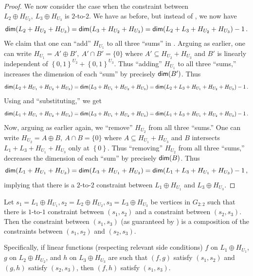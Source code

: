 \documentclass{toc}
\newcommand\set[1]{{\left\{ #1 \right\}}}
\newcommand\power[1]{\set{0,1}^{#1}}
\newcommand*\xor{\mathbin{\oplus}}
\begin{document}
\begin{proof}
\medskip
We now consider the case when the constraint between $L_2\xor H_{U_2}, ~L_3\xor H_{U_3}$ is $2$-to-$2$. We have  as before,
but instead of , we now have
\begin{equation} \label{eqn:tr-3}
{\sf dim}(L_2+ H_{U_2}+ H_{U_3}) = {\sf dim}(L_3+ H_{U_2}+ H_{U_3}) = {\sf dim}(L_2+ L_3+ H_{U_2}+ H_{U_3})-1\,.%
\end{equation}
We claim that one can ``add'' $H_{U_1}$ to all three ``sums'' in . Arguing as earlier, one can write $H_{U_1} = A' \xor B', ~A' \cap B' = \{0\}$ where
$A' \subseteq H_{U_2}+ H_{U_3}$ and $B'$ is linearly independent of $\power{U_2}+ \power{U_3}$. Thus ``adding'' $H_{U_1}$ to all three ``sums,'' increases
the dimension of each ``sum'' by precisely ${\sf dim}(B')$. Thus
\[
{\sf dim}(L_2+ H_{U_1} + H_{U_2}+ H_{U_3}) = {\sf dim}(L_3+ H_{U_1} + H_{U_2}+ H_{U_3}) = {\sf dim}(L_2+ L_3+ H_{U_1} + H_{U_2}+ H_{U_3})-1\,.%
\]
Using  and ``substituting,'' we get
\[
{\sf dim}(L_1+ H_{U_1} + H_{U_2}+ H_{U_3}) = {\sf dim}(L_3+ H_{U_1} + H_{U_2}+ H_{U_3}) = {\sf dim}(L_1+ L_3+ H_{U_1} + H_{U_2}+ H_{U_3})-1\,.%
\]
Now, arguing as earlier again, we ``remove'' $H_{U_2}$ from all three ``sums.'' One can write $H_{U_2} =  A \xor B, ~A \cap B = \{0\}$ where
$A \subseteq H_{U_1}+ H_{U_3}$ and $B$ intersects $L_1+ L_3+ H_{U_1} + H_{U_3}$ only at $\set{0}$. Thus ``removing'' $H_{U_2}$ from  all three ``sums,'' decreases
the dimension of each ``sum'' by precisely ${\sf dim}(B)$. Thus
\[
{\sf dim}(L_1+ H_{U_1} + H_{U_3}) = {\sf dim}(L_3+ H_{U_1} + H_{U_3}) = {\sf dim}(L_1+ L_3+ H_{U_1} + H_{U_3})-1\,,%
\]
implying that there is a $2$-to-$2$ constraint between $L_1 \xor H_{U_1}$ and $L_3 \xor H_{U_3}$.
\end{proof}




\begin{lemma}\label{lemma:constraint_composition}
Let $s_1 = L_1\xor H_{U_1},  s_2 = L_2\xor H_{U_2}, s_3 = L_3\xor H_{U_3}$
be vertices in $G_{2:2}$ such that there is $1$-to-$1$ constraint between $(s_1, s_2)$ and a constraint between $(s_2, s_3)$.
Then the  constraint between $(s_1, s_3)$ (as guaranteed by ) is a composition of the constraints
between $(s_1, s_2)$ and $(s_2, s_3)$.

Specifically, if linear functions (respecting relevant side
conditions) $f$ on $L_1 \xor H_{U_1}$, $g$ on $L_2 \xor H_{U_2}$, and $h$ on $L_3\xor H_{U_3}$ are such that
  $(f,g)$ satisfy $(s_1, s_2)$ and
  $(g,h)$ satisfy $(s_2, s_3)$,
then $(f,h)$ satisfy $(s_1, s_3)$.
\end{lemma}
\end{document}
